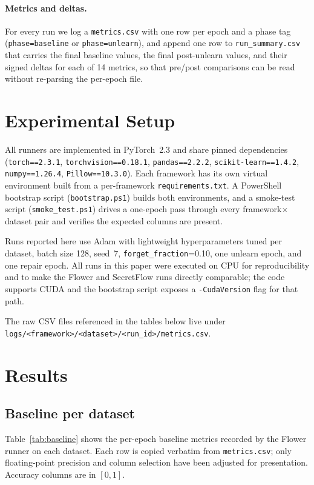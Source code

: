 \documentclass[letterpaper,twocolumn,10pt]{article}
\begin{document}
\paragraph{Metrics and deltas.}
For every run we log a \texttt{metrics.csv} with one row per epoch and
a phase tag (\texttt{phase=baseline} or \texttt{phase=unlearn}), and
append one row to \texttt{run\_summary.csv} that carries the final
baseline values, the final post-unlearn values, and their signed
deltas for each of 14 metrics, so that pre/post comparisons can be read
without re-parsing the per-epoch file.

\section{Experimental Setup}

All runners are implemented in PyTorch~2.3 and share pinned dependencies
(\texttt{torch==2.3.1}, \texttt{torchvision==0.18.1},
\texttt{pandas==2.2.2}, \texttt{scikit-learn==1.4.2},
\texttt{numpy==1.26.4}, \texttt{Pillow==10.3.0}). Each framework has its
own virtual environment built from a per-framework
\texttt{requirements.txt}. A PowerShell bootstrap script
(\texttt{bootstrap.ps1}) builds both environments, and a smoke-test
script (\texttt{smoke\_test.ps1}) drives a one-epoch pass through every
framework$\times$dataset pair and verifies the expected columns are
present.

Runs reported here use Adam with lightweight hyperparameters tuned per
dataset, batch size 128, seed~7, \texttt{forget\_fraction}=0.10, one
unlearn epoch, and one repair epoch. All runs in this paper were
executed on CPU for reproducibility and to make the Flower and
SecretFlow runs directly comparable; the code supports CUDA and the
bootstrap script exposes a \texttt{-CudaVersion} flag for that path.

The raw CSV files referenced in the tables below live under
\texttt{logs/<framework>/<dataset>/<run\_id>/metrics.csv}.

\section{Results}

\subsection{Baseline per dataset}

Table~\ref{tab:baseline} shows the per-epoch baseline metrics recorded by
the Flower runner on each dataset. Each row is copied verbatim from
\texttt{metrics.csv}; only floating-point precision and column selection
have been adjusted for presentation. Accuracy columns are in $[0,1]$.
\end{document}
